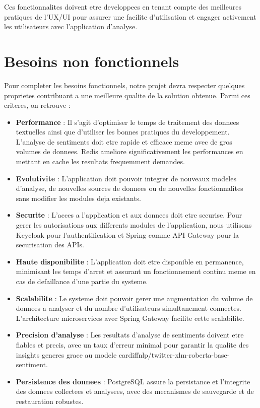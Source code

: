 Ces fonctionnalites doivent etre developpees en tenant compte des meilleures pratiques de l'UX/UI pour assurer une facilite d'utilisation et engager activement les utilisateurs avec l'application d'analyse.

\section{Besoins non fonctionnels}

Pour completer les besoins fonctionnels, notre projet devra respecter quelques proprietes contribuant a une meilleure qualite de la solution obtenue. Parmi ces criteres, on retrouve :

\begin{itemize}
    \item \textbf{Performance} : Il s'agit d'optimiser le temps de traitement des donnees textuelles ainsi que d'utiliser les bonnes pratiques du developpement. L'analyse de sentiments doit etre rapide et efficace meme avec de gros volumes de donnees. Redis ameliore significativement les performances en mettant en cache les resultats frequemment demandes.
    
    \item \textbf{Evolutivite} : L'application doit pouvoir integrer de nouveaux modeles d'analyse, de nouvelles sources de donnees ou de nouvelles fonctionnalites sans modifier les modules deja existants.
    
    \item \textbf{Securite} : L'acces a l'application et aux donnees doit etre securise. Pour gerer les autorisations aux differents modules de l'application, nous utilisons Keycloak pour l'authentification et Spring comme API Gateway pour la securisation des APIs.
    
    \item \textbf{Haute disponibilite} : L'application doit etre disponible en permanence, minimisant les temps d'arret et assurant un fonctionnement continu meme en cas de defaillance d'une partie du systeme.
    
    \item \textbf{Scalabilite} : Le systeme doit pouvoir gerer une augmentation du volume de donnees a analyser et du nombre d'utilisateurs simultanement connectes. L'architecture microservices avec Spring Gateway facilite cette scalabilite.
    
    \item \textbf{Precision d'analyse} : Les resultats d'analyse de sentiments doivent etre fiables et precis, avec un taux d'erreur minimal pour garantir la qualite des insights generes grace au modele cardiffnlp/twitter-xlm-roberta-base-sentiment.
    
    \item \textbf{Persistence des donnees} : PostgreSQL assure la persistance et l'integrite des donnees collectees et analysees, avec des mecanismes de sauvegarde et de restauration robustes.
\end{itemize}

